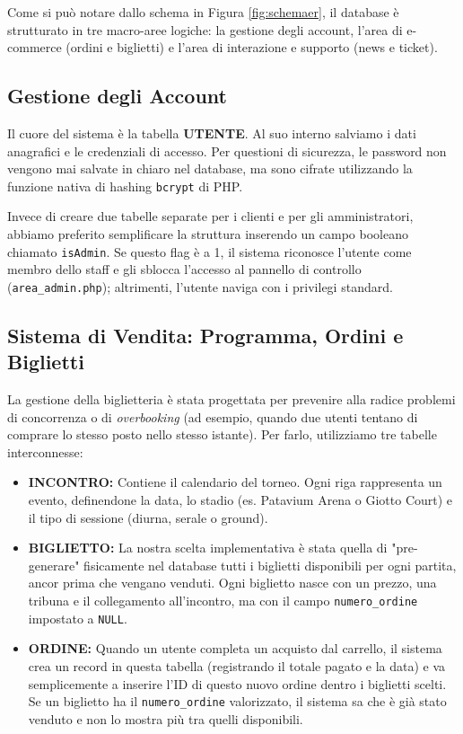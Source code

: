 \documentclass[11pt,a4paper]{article}
\begin{document}
Come si può notare dallo schema in Figura \ref{fig:schemaer}, il database è strutturato in tre macro-aree logiche: la gestione degli account, l'area di e-commerce (ordini e biglietti) e l'area di interazione e supporto (news e ticket).

\subsection{Gestione degli Account}
Il cuore del sistema è la tabella \textbf{UTENTE}. Al suo interno salviamo i dati anagrafici e le credenziali di accesso. Per questioni di sicurezza, le password non vengono mai salvate in chiaro nel database, ma sono cifrate utilizzando la funzione nativa di hashing \texttt{bcrypt} di PHP. 

Invece di creare due tabelle separate per i clienti e per gli amministratori, abbiamo preferito semplificare la struttura inserendo un campo booleano chiamato \texttt{isAdmin}. Se questo flag è a 1, il sistema riconosce l'utente come membro dello staff e gli sblocca l'accesso al pannello di controllo (\texttt{area\_admin.php}); altrimenti, l'utente naviga con i privilegi standard.

\subsection{Sistema di Vendita: Programma, Ordini e Biglietti}
La gestione della biglietteria è stata progettata per prevenire alla radice problemi di concorrenza o di \textit{overbooking} (ad esempio, quando due utenti tentano di comprare lo stesso posto nello stesso istante). Per farlo, utilizziamo tre tabelle interconnesse:

\begin{itemize}
    \item \textbf{INCONTRO:} Contiene il calendario del torneo. Ogni riga rappresenta un evento, definendone la data, lo stadio (es. Patavium Arena o Giotto Court) e il tipo di sessione (diurna, serale o ground).
    \item \textbf{BIGLIETTO:} La nostra scelta implementativa è stata quella di "pre-generare" fisicamente nel database tutti i biglietti disponibili per ogni partita, ancor prima che vengano venduti. Ogni biglietto nasce con un prezzo, una tribuna e il collegamento all'incontro, ma con il campo \texttt{numero\_ordine} impostato a \texttt{NULL}.
    \item \textbf{ORDINE:} Quando un utente completa un acquisto dal carrello, il sistema crea un record in questa tabella (registrando il totale pagato e la data) e va semplicemente a inserire l'ID di questo nuovo ordine dentro i biglietti scelti. Se un biglietto ha il \texttt{numero\_ordine} valorizzato, il sistema sa che è già stato venduto e non lo mostra più tra quelli disponibili.
\end{itemize}
\end{document}
